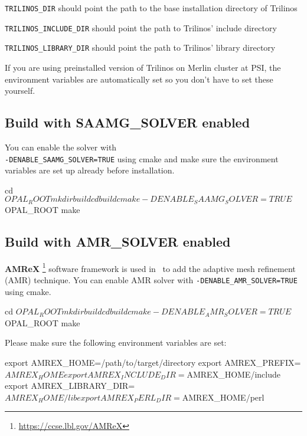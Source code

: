 \texttt{TRILINOS\_DIR} should point the path to the base installation directory of Trilinos

\texttt{TRILINOS\_INCLUDE\_DIR} should point the path to Trilinos' include directory

\texttt{TRILINOS\_LIBRARY\_DIR} should point the path to Trilinos' library directory

If you are using preinstalled version of Trilinos on Merlin cluster at PSI, the environment variables
are automatically set so you don't have to set these yourself.

\begin{footnotesize}
\end{footnotesize}

\subsection{Build \opal with SAAMG\_SOLVER enabled}
You can enable the solver with\\ \texttt{-DENABLE\_SAAMG\_SOLVER=TRUE} using cmake
and make sure the environment variables 
are set up already before {\opal} installation.

\begin{footnotesize}
\begin{example}
cd $OPAL_ROOT
mkdir build
cd build
cmake -DENABLE_SAAMG_SOLVER=TRUE $OPAL_ROOT
make
\end{example}
\end{footnotesize}

\subsection{Build \opal with AMR\_SOLVER enabled}
{\bf AMReX} \footnote{\url{https://ccse.lbl.gov/AMReX}} software framework is used in \opal\  to add the adaptive mesh
refinement (AMR) technique. You can enable AMR solver with {\tt -DENABLE\_AMR\_SOLVER=TRUE} using cmake.

\begin{footnotesize}
\begin{example}
cd $OPAL_ROOT
mkdir build
cd build
cmake -DENABLE_AMR_SOLVER=TRUE $OPAL_ROOT
make
\end{example}
\end{footnotesize}
Please make sure the following environment variables are set:
\begin{footnotesize}
\begin{example}
export AMREX_HOME=/path/to/target/directory
export AMREX_PREFIX=$AMREX_HOME
export AMREX_INCLUDE_DIR=$AMREX_HOME/include
export AMREX_LIBRARY_DIR=$AMREX_HOME/lib
export AMREX_PERL_DIR=$AMREX_HOME/perl
\end{example}
 \label{subsec:envvar_AMR}
\end{footnotesize}

